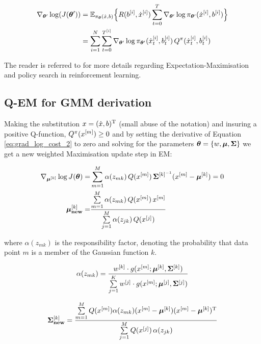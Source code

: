 \begin{align}
 \nabla_{\boldsymbol{\theta}'}  \log( J(\boldsymbol{\theta}') ) &= \mathbb{E}_{\pi_{\boldsymbol{\theta}}(\dot{x},b)}\Big\{R(b^{[i]},\dot{x}^{[i]})  \sum_{t=0}^{T}\nabla_{\boldsymbol{\theta}'}\log \pi_{\boldsymbol{\theta}'}(\dot{x}^{[i]},b^{[i]})\Big\}\\
				    &= \sum\limits_{i=1}^{N} \sum\limits_{t=0}^{T^{[i]}} \nabla_{\boldsymbol{\theta}'}\log \pi_{\boldsymbol{\theta}'}(\dot{x}^{[i]}_t,b^{[i]}_t) \, Q^{\pi}(\dot{x}^{[i]}_t,b^{[i]}_t) \label{eq:grad_log_cost_2}
\end{align}

The reader is referred to \cite{rl_gradient_survey_2013} for more details regarding Expectation-Maximisation and policy search in reinforcement learning.

\subsection{Q-EM for GMM derivation}\label{app:grad}

Making the substitution $x = (\dot{x},b)^{\mathrm{T}}$ (small abuse of the notation) and  insuring a positive Q-function, $Q^{\pi}(x^{[m]}) \geq 0$
and by setting the derivative of Equation \ref{eq:grad_log_cost_2} to zero and solving for the parameters
$\boldsymbol{\theta}=\{w,\boldsymbol{\mu},\boldsymbol{\Sigma}\}$ we get a new weighted Maximisation update step in EM:

\begin{align}
\nabla_{\boldsymbol{\mu}^{[k]}} \log J(\boldsymbol{\theta}) =& \sum\limits_{m=1}^{M} \alpha(z_{mk})\, Q(x^{[m]})\, \boldsymbol{\Sigma}^{[k]^{-1}} (x^{[m]} - \boldsymbol{\mu}^{[k]}) = 0 \nonumber \\
			 \boldsymbol{\mu}^{[k]}_{\textrm{\textbf{new}}} =& \frac{\sum\limits_{m=1}^{M} \alpha(z_{mk})\, Q(x^{[m]})\, x^{[m]} }{\sum\limits_{j=1}^{M} \alpha(z_{jk})\, Q(x^{[j]})}
\end{align}

where $\alpha(z_{mk})$ is the responsibility factor, denoting the probability that data point $m$ is a member of the 
Gaussian function $k$.

\begin{equation}
 \alpha(z_{mk}) = \frac{w^{[k]} \cdot g(x^{[m]};\boldsymbol{\mu}^{[k]},\boldsymbol{\Sigma}^{[k]})}{\sum\limits_{j=1}^{K}w^{[j]} \cdot g(x^{[m]};\boldsymbol{\mu}^{[j]},\boldsymbol{\Sigma}^{[j]})}
\end{equation}

\begin{equation}
   \boldsymbol{\Sigma}^{[k]}_{\textrm{\textbf{new}}} = \frac{\sum\limits_{m=1}^{M} Q(x^{[m]}) \alpha(z_{mk}) (x^{[m]} - \boldsymbol{\mu}^{[k]})(x^{[m]} - \boldsymbol{\mu}^{[k]})^{\mathrm{T}} }{ \sum\limits_{j=1}^{M} Q(x^{[j]})\, \alpha(z_{jk}) }
\end{equation}

